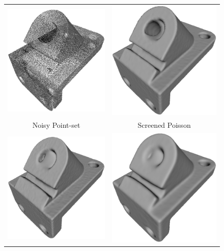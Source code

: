 \begin{figure} 
	\centering
	\begin{tabular}{c c}
		\includegraphics[width=0.48\linewidth]{images/robust/pointset.eps} &
		\includegraphics[width=0.48\linewidth]{images/robust/poisson.eps} \\
		Noisy Point-set & Screened Poisson  \\
		\includegraphics[width=0.48\linewidth]{images/robust/bcclowlambda.eps} &
		\includegraphics[width=0.48\linewidth]{images/robust/bccbiggerlambda.eps} \\ 

\end{tabular}
\end{figure}
